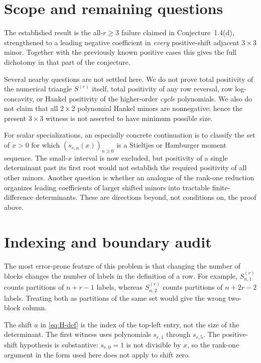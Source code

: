 \documentclass[11pt,a4paper]{article}
\theoremstyle{definition}
\numberwithin{equation}{section}
\begin{document}
\section{Scope and remaining questions}
\label{sec:scope}

The established result is the all-$r\ge3$ failure claimed in
Conjecture~1.4(d), strengthened to a leading negative coefficient in
\emph{every} positive-shift adjacent $3\times3$ minor. Together with the
previously known positive cases this gives the full dichotomy in that
part of the conjecture.

Several nearby questions are not settled here. We do not prove total
positivity of the numerical triangle $S^{(r)}$ itself, total positivity
of any row reversal, row log-concavity, or Hankel positivity of the
higher-order \emph{cycle} polynomials. We also do not claim that all
$2\times2$ polynomial Hankel minors are nonnegative; hence the present
$3\times3$ witness is not asserted to have minimum possible size.

For scalar specializations, an especially concrete continuation is to
classify the set of $x>0$ for which $(s_{r,n}(x))_{n\ge0}$ is a
Stieltjes or Hamburger moment sequence. The small-$x$ interval is now
excluded, but positivity of a single determinant past its first root
would not establish the required positivity of all other minors.
Another question is whether an analogue of the rank-one reduction
organizes leading coefficients of larger shifted minors into tractable
finite-difference determinants. These are directions beyond, not
conditions on, the proof above.

\appendix
\section{Indexing and boundary audit}

The most error-prone feature of this problem is that changing the number
of blocks changes the number of labels in the definition of a row.
For example, $S^{(r)}_{n,1}$ counts partitions of $n+r-1$ labels, whereas
$S^{(r)}_{n,2}$ counts partitions of $n+2r-2$ labels. Treating both as
partitions of the same set would give the wrong two-block column.

The shift $a$ in \eqref{eq:H-def} is the index of the top-left entry,
not the size of the determinant. The first witness uses polynomials
$s_{r,1}$ through $s_{r,5}$. The positive-shift hypothesis is substantive:
$s_{r,0}=1$ is not divisible by $x$, so the rank-one argument in the form
used here does not apply to shift zero.
\end{document}
